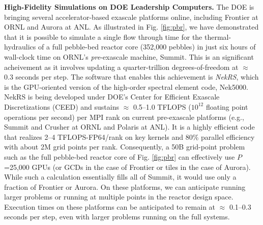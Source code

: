 \noindent
{\bf High-Fidelity Simulations on DOE Leadership Computers.}
The DOE is bringing several accelerator-based exascale platforms online,
including Frontier at ORNL and Aurora at ANL.
As illustrated in Fig. \ref{fig:pbr},
we have demonstrated that it is possible to simulate a single flow
through time for the thermal-hydraulics of a full pebble-bed reactor core
(352,000 pebbles) in just six hours of wall-clock time on ORNL's {\em
pre}-exascale machine, Summit.   This is an significant acheivement as it
involves updating a quarter-trillion degrees-of-freedom at $\approx$ 0.3
seconds per step.  
The software that enables this achievement is {\em NekRS}, which is the
GPU-oriented version of the high-order spectral element code, Nek5000. 
NekRS is being developed under DOE's Center for Efficient Exascale Discretizations
(CEED) and sustains $\approx$ 0.5--1.0 TFLOPS ($10^{12}$ floating point
operations per second) per MPI rank on current pre-exascale platforms (e.g.,
Summit and Crusher at ORNL and Polaris at ANL).  It is a highly efficient code
that realizes 2--4 TFLOPS-FP64/rank on key kernels and 80\% parallel efficiency
with about 2M grid points per rank.  Consequently, a 50B grid-point problem
such as the full pebble-bed reactor core of Fig. \ref{fig:pbr} can effectively
use $P$=25,000 GPUs (or GCDs in the case of Frontier or tiles in the case of
Aurora).  While such a calculation essentially fills all of Summit, it would
use only a fraction of Frontier or Aurora.  On these platforms, we can
anticipate running larger problems or running at multiple points in the reactor
design space.  Execution times on these platforms can be anticipated to remain
at $\approx$ 0.1--0.3 seconds per step, even with larger problems running on
the full systems.



